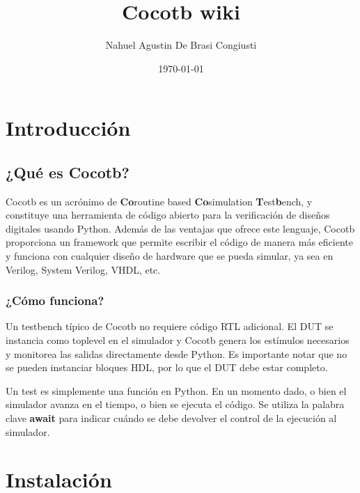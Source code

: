 \documentclass[a4paper,12pt]{article}
\title{Cocotb wiki}
\author{Nahuel Agustin De Brasi Congiusti}
\date{\today}
\begin{document}
\maketitle

\setcounter{tocdepth}{4}
\setcounter{secnumdepth}{4}

\newpage

\tableofcontents

\newpage

\section{Introducción}

\subsection{¿Qué es Cocotb?}

Cocotb es un acrónimo de \textbf{Co}routine based \textbf{Co}simulation \textbf{T}est\textbf{b}ench, y constituye una herramienta de código abierto para la verificación de diseños digitales usando Python. Además de las ventajas que ofrece este lenguaje, Cocotb proporciona un framework que permite escribir el código de manera más eficiente y funciona con cualquier diseño de hardware que se pueda simular, ya sea en Verilog, System Verilog, VHDL, etc.

\subsubsection{¿Cómo funciona?}

Un testbench típico de Cocotb no requiere código RTL adicional. El DUT se instancia como toplevel en el simulador y Cocotb genera los estímulos necesarios y monitorea las salidas directamente desde Python. Es importante notar que no se pueden instanciar bloques HDL, por lo que el DUT debe estar completo.

Un test es simplemente una función en Python. En un momento dado, o bien el simulador avanza en el tiempo, o bien se ejecuta el código. Se utiliza la palabra clave \textbf{await} para indicar cuándo se debe devolver el control de la ejecución al simulador.



\newpage

\section{Instalación}
\end{document}
